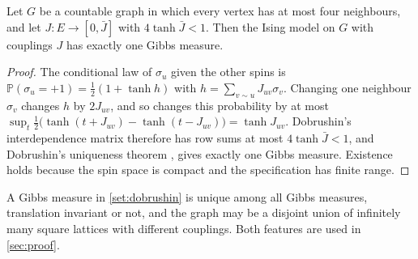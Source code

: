 \begin{lemma}[Dobrushin]\label{set:dobrushin}
Let $G$ be a countable graph in which every vertex has at most four neighbours, and let $J\colon E\to[0,\bar J]$ with $4\tanh\bar J<1$. Then the Ising model on $G$ with couplings $J$ has exactly one Gibbs measure.
\end{lemma}

\begin{proof}
The conditional law of $\sigma_u$ given the other spins is $\mathbb P(\sigma_u=+1)=\frac12(1+\tanh h)$ with $h=\sum_{v\sim u}J_{uv}\sigma_v$. Changing one neighbour $\sigma_v$ changes $h$ by $2J_{uv}$, and so changes this probability by at most $\sup_t\frac12\bigl(\tanh(t+J_{uv})-\tanh(t-J_{uv})\bigr)=\tanh J_{uv}$. Dobrushin's interdependence matrix therefore has row sums at most $4\tanh\bar J<1$, and Dobrushin's uniqueness theorem \cite{Dobrushin68}, \cite[Theorem~8.7]{Georgii11} gives exactly one Gibbs measure. Existence holds because the spin space is compact and the specification has finite range.
\end{proof}

A Gibbs measure in \cref{set:dobrushin} is unique among all Gibbs measures, translation invariant or not, and the graph may be a disjoint union of infinitely many square lattices with different couplings. Both features are used in \cref{sec:proof}.
